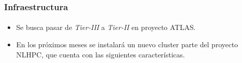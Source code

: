 \frame
{
\frametitle{Infraestructura}
\framesubtitle{}
\begin{itemize}
\item Se busca pasar de \emph{Tier-III} a \emph{Tier-II} en proyecto ATLAS.

\item En los próximos meses se instalará un nuevo cluster parte del proyecto NLHPC, 
que cuenta con las siguientes características.

\end{itemize}
\begin{table}[h]
\centering
{}
\caption{Características del cluster Proyecto NLHPC}
\end{table}

}
